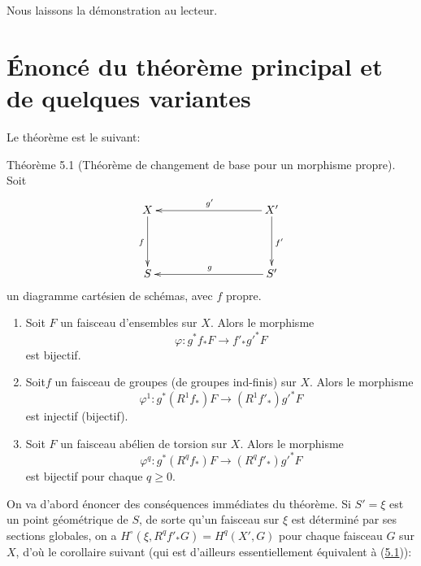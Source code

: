 \documentclass[10pt]{../fichiers-configuration-latex/smfart}
\begin{document}
Nous laissons la démonstration au lecteur.

\section{Énoncé du théorème principal et de quelques variantes}

Le théorème est le suivant:

\begin{enonce*}{Théorème 5.1}
(Théorème de changement de base pour un morphisme propre). Soit
$$
\xymatrix@C=3.25cm@R=1.5cm{
X \ar[d]_{f} &   X' \ar[l]_{g'} \ar[d]^{f'}\\
S                      & S' \ar[l]_{g}
}
$$
un diagramme cartésien de schémas, avec $f$ propre.
\begin{enumerate}
\renewcommand{\theenumi}{\roman{enumi}}
\renewcommand{\labelenumi}{(\theenumi)}
\item Soit $F$ un faisceau d'ensembles sur $X$. Alors le morphisme
$$
\varphi:g^{\ast}f_{\ast}F\longrightarrow {f'}_{\ast}{g'}^{\ast}F
$$
est bijectif.

\item Soit\pageoriginale $f$ un faisceau de groupes 
(\resp de groupes ind-finis) sur
  $X$. Alors le morphisme 
$$
\varphi^1:g^{\ast}(R^1f_{\ast})F\rightarrow
(R^1{f'}_{\ast}){g'}^{\ast}F
$$
est injectif (\resp bijectif).

\item Soit $F$ un faisceau abélien de torsion sur $X$. Alors le
  morphisme 
$$
\varphi^q:g^{\ast}(R^qf_{\ast})F\longrightarrow
(R^q{f'}_{\ast}){g'}^{\ast}F
$$
est bijectif pour chaque $q\geq 0$.
\end{enumerate}
\end{enonce*}

On va d'abord énoncer des conséquences immédiates du théorème. Si
$S'=\xi$ est un point géométrique de $S$, de sorte qu'un faisceau sur
$\xi$ est déterminé par ses sections globales, on a
$H^{\circ}(\xi,R^q{f'}_{\ast}G)=H^q(X',G)$ pour chaque faisceau $G$
sur $X$, d'où le corollaire suivant (qui est d'ailleurs
essentiellement équivalent à (\hyperref[XII.thm5.1]{5.1})):
\end{document}
